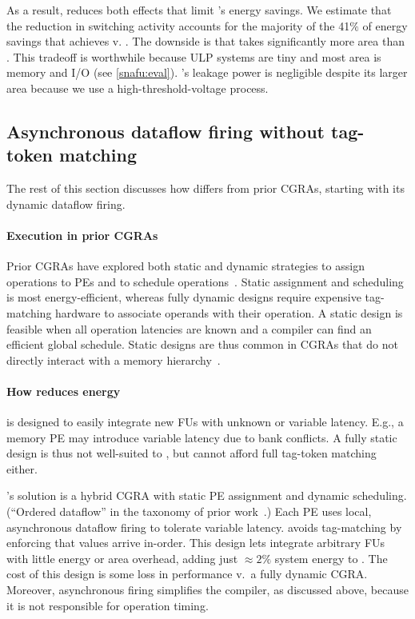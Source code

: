 As a result, \snafuframe reduces both effects that limit \manic's energy savings.
%
We estimate that the reduction in switching activity accounts for the majority of the 41$\%$ of energy savings that \snafuframe achieves v. \manic. 
%
The downside is that \snafu takes significantly more area
than \manic.
This tradeoff is worthwhile because ULP systems are tiny and most area is memory and I/O
(see \autoref{snafu:eval}).
%
\snafu's leakage power is negligible despite its larger area because we use a high-threshold-voltage process.

\subsection{Asynchronous dataflow firing without tag-token matching}

The rest of this section discusses how \snafuframe differs from prior CGRAs,
starting with its dynamic dataflow firing.

\paragraph{Execution in prior CGRAs}
%
Prior CGRAs have explored both static and dynamic strategies
to assign operations to PEs
and to schedule operations~\cite{weng2020hybrid}.
%
Static assignment and scheduling is most energy-efficient,
whereas fully dynamic designs require expensive tag-matching hardware to associate operands with their operation.
%
A static design is feasible when all operation latencies are known and a
compiler can find an efficient global schedule.
%
Static designs are thus common in CGRAs that do not directly interact with a memory hierarchy~\cite{dyser,karunaratne2017hycube,nowatzki:isca17:stream-dataflow}.

\paragraph{How \snafu reduces energy}
%
\snafuframe is designed to easily integrate new FUs with unknown or variable
latency.
%
E.g., a memory PE may introduce variable latency due to bank conflicts.
%
A fully static design is thus not well-suited to \snafuframe, but \snafuframe cannot afford full tag-token matching either.

\snafuframe's solution is a hybrid CGRA with static PE assignment and dynamic scheduling.
%
(``Ordered dataflow'' in the taxonomy of prior work~\cite{weng2020hybrid}.)
%
Each PE uses local, asynchronous dataflow firing to tolerate variable latency.
%
\snafuframe avoids tag-matching by enforcing that values arrive in-order.
%
This design lets \snafuframe integrate arbitrary FUs with little energy or area overhead,
adding just $\approx2\%$ system energy to \snafuarch. 
%
The cost of this design is some loss in performance v.\ a fully dynamic CGRA.
%
Moreover, asynchronous firing simplifies the compiler, as discussed
above, because it is not responsible for operation timing.

